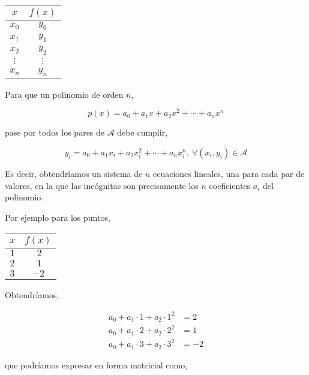 \begin{table}[h]
\centering
\begin{tabular}{c|c}
$x$&$f(x)$\\ 
\hline
$x_0$& $y_0$\\
$x_1$&$y_1$\\
$x_2$&$y_2$\\
$\vdots$&$\vdots$\\
$x_n$&$y_n$
\end{tabular}
\label{tpuntos3}
\end{table}
\begin{paracol}{2}
Para que un polinomio de orden $n$,
\end{paracol}
\begin{equation*}
p(x)=a_0+a_1x+a_2x^2+\cdots+a_nx^n
\end{equation*}
\begin{paracol}{2}
pase por todos los pares de $\mathcal{A}$ debe cumplir,
\end{paracol}
\begin{equation*}
y_i=a_0+a_1x_i+a_2x_i^2+\cdots+a_nx_i^n, \ \forall (x_i,y_i) \in \mathcal{A}
\end{equation*}
\begin{paracol}{2}
Es decir, obtendríamos un sistema de $n$ ecuaciones lineales, una para cada par de valores, en la que las incógnitas son precisamente los $n$ coeficientes $a_i$ del polinomio.

Por ejemplo para los puntos,
\end{paracol}
\begin{table}[h]
\centering 
\begin{tabular}{c|c}
$x$&$f(x)$\\ 
\hline
$1$&$\ 2$\\
$2$&$ \ 1$\\
$3$&$-2$
\end{tabular}
\label{tpuntos4}
\end{table}
\begin{paracol}{2}
Obtendríamos,
\end{paracol}
\begin{align*}
a_0+a_1\cdot 1+ a_2\cdot 1^2&=2\\
a_0+a_1\cdot 2+ a_2\cdot 2^2&=1\\
a_0+a_1\cdot 3+ a_2\cdot 3^2&=-2
\end{align*}
\begin{paracol}{2}
que podríamos expresar en forma matricial como,
\end{paracol}

